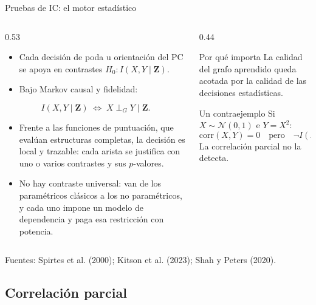 \documentclass[aspectratio=169,11pt]{beamer}
\begin{document}
\begin{frame}[t]{Pruebas de IC: el motor estadístico}
  \small
  \begin{columns}[T,onlytextwidth]
    \begin{column}{0.53\textwidth}
      \begin{itemize}
        \item Cada decisión de poda u orientación del PC se apoya en
              contrastes $H_0: I(X,Y\mid\mathbf Z)$.
        \item Bajo Markov causal y fidelidad:
      \end{itemize}
      \[
        I(X,Y\mid\mathbf Z)
        \;\Longleftrightarrow\;
        X\perp_G Y\mid\mathbf Z.
      \]
      \begin{itemize}
        \item Frente a las funciones de puntuación, que evalúan estructuras
              completas, la decisión es \alert{local y trazable}: cada arista
              se justifica con uno o varios contrastes y sus $p$-valores.
        \item No hay contraste universal: van de los paramétricos clásicos a
              los no paramétricos, y cada uno impone un modelo de dependencia
              y paga esa restricción con potencia.
      \end{itemize}
    \end{column}
    \begin{column}{0.44\textwidth}
      \begin{block}{Por qué importa}
        La calidad del grafo aprendido queda acotada por la calidad de las
        decisiones estadísticas.
      \end{block}
      \begin{alertblock}{Un contraejemplo}
        Si $X\sim\mathcal N(0,1)$ e $Y=X^2$:
        \[
          \mathrm{corr}(X,Y)=0
          \quad\text{pero}\quad
          \neg I(X,Y).
        \]
        La correlación parcial no la detecta.
      \end{alertblock}
    \end{column}
  \end{columns}
  {\scriptsize\color{upmgray}Fuentes: Spirtes et al. (2000); Kitson et al.
  (2023); Shah y Peters (2020).}
\end{frame}

\subsection{Correlación parcial}
\end{document}
